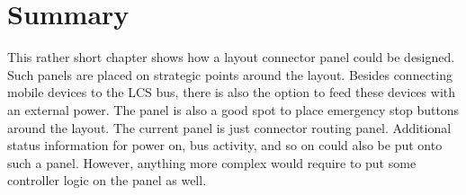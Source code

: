 
\section{Summary}

This rather short chapter shows how a layout connector panel could be designed. Such panels are placed on strategic points around the layout. Besides connecting mobile devices to the LCS bus, there is also the option to feed these devices with an external power.  The panel is also a good spot to place emergency stop buttons around the layout.  The current panel is just connector routing panel.  Additional status information for power on, bus activity, and so on could also be put onto such a panel. However, anything more complex would require to put some controller logic on the panel as well.

